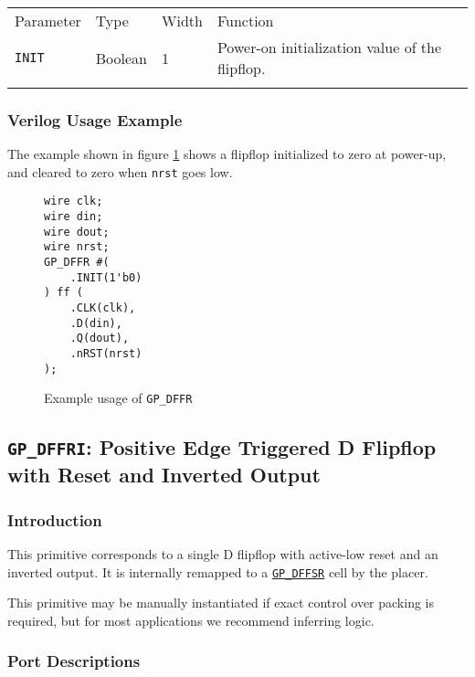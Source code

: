 \documentclass[11pt]{article}
\newcommand{\tokenstyle}[1]{\texttt{#1}}
\newcommand{\wirestyle}[1]{\texttt{#1}}
\newcommand{\whenstyle}[1]{{\fontseries{sb}\selectfont#1}}
\newcommand{\tokenref}[2]{\hyperref[#2]{\tokenstyle{#1}}}
\newcommand{\thinhline}{\Xhline{1\arrayrulewidth}}
\newcommand{\thickhline}{\Xhline{2.5\arrayrulewidth}}
\begin{document}
\begin{tabularx}{\textwidth}{lllX}
\thinhline
\whenstyle{Parameter} & \whenstyle{Type} & \whenstyle{Width} & \whenstyle{Function} \\
\thickhline
\tokenstyle{INIT} & Boolean & 1 & Power-on initialization value of the flipflop. \\
\thinhline
\end{tabularx}

\subsubsection{Verilog Usage Example}

The example shown in figure \ref{gp-dffr-example} shows a flipflop initialized to zero at power-up, and cleared to zero
when \wirestyle{nrst} goes low.

\begin{figure}[h]
\begin{lstlisting}
wire clk;
wire din;
wire dout;
wire nrst;
GP_DFFR #(
	.INIT(1'b0)
) ff (
	.CLK(clk),
	.D(din),
	.Q(dout),
	.nRST(nrst)
);
\end{lstlisting}
\caption{Example usage of \tokenstyle{GP\_DFFR}}
\label{gp-dffr-example}
\end{figure}


\pagebreak
\subsection{\tokenstyle{GP\_DFFRI}: Positive Edge Triggered D Flipflop with Reset and Inverted Output}
\label{gp-dffr}

\subsubsection{Introduction}
This primitive corresponds to a single D flipflop with active-low reset and an inverted output. It is internally
remapped to a \tokenref{GP\_DFFSR}{gp-dffsr} cell by the placer.

This primitive may be manually instantiated if exact control over packing is required, but for most applications we
recommend inferring logic.

\subsubsection{Port Descriptions}
\end{document}
